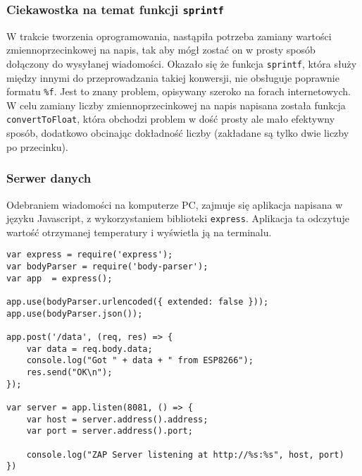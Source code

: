 \subsubsection{Ciekawostka na temat funkcji \texttt{sprintf}}
W trakcie tworzenia oprogramowania, nastąpiła potrzeba zamiany wartości zmiennoprzecinkowej
na napis, tak aby mógł zostać on w prosty sposób dołączony do wysyłanej wiadomości.
Okazało się że funkcja \verb+sprintf+, która służy między innymi do przeprowadzania takiej
konwersji, nie obsługuje poprawnie formatu \verb+%f+. Jest to znany problem, opisywany
szeroko na forach internetowych. W celu zamiany liczby zmiennoprzecinkowej na napis
napisana została funkcja \verb+convertToFloat+, która obchodzi problem w dość prosty
ale mało efektywny sposób, dodatkowo obcinając dokładność liczby (zakładane są tylko 
dwie liczby po przecinku).\\

\subsubsection{Serwer danych}
Odebraniem wiadomości na komputerze PC, zajmuje się aplikacja napisana w języku 
Javascript, z wykorzystaniem biblioteki \verb+express+. Aplikacja ta odczytuje 
wartość otrzymanej temperatury i wyświetla ją na terminalu.

\begin{lstlisting}[style=customjs,
  frame=single,
  caption={Prosta aplikacja do zbierania danych z czujnika},
  captionpos=b,
  label={kod_serwera}]
var express = require('express');
var bodyParser = require('body-parser');
var app  = express();

app.use(bodyParser.urlencoded({ extended: false }));
app.use(bodyParser.json());

app.post('/data', (req, res) => {
    var data = req.body.data;
    console.log("Got " + data + " from ESP8266");
    res.send("OK\n");
});

var server = app.listen(8081, () => {
    var host = server.address().address;
    var port = server.address().port;

    console.log("ZAP Server listening at http://%s:%s", host, port)
})

\end{lstlisting}
